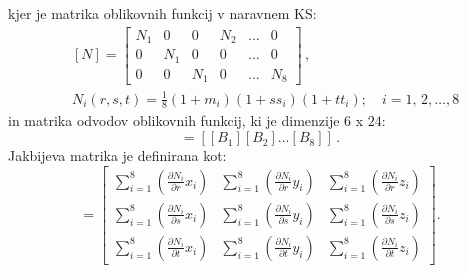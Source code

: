         kjer je matrika oblikovnih funkcij v naravnem KS: 
        \begin{align}
        &[N]=\left[\begin{array}{cccccc}
        N_{1} & 0 & 0 & N_{2} & \ldots & 0 \\
        0 & N_{1} & 0 & 0 & \ldots & 0 \\
        0 & 0 & N_{1} & 0 & \ldots & N_{8}
        \end{array}\right] \,, \\
        &N_{i}(r, s, t)=\frac{1}{8}\left(1+m_{i}\right)\left(1+s s_{i}\right)\left(1+t t_{i}\right) ; \quad i=1,\,2, \ldots, 8 
        \end{align}
        in matrika odvodov oblikovnih funkcij, ki je dimenzije $6$ x $24$:
        \begin{equation}
        [B]=\left[\left[B_{1}\right]\left[B_{2}\right] \ldots\left[B_{8}\right]\right] \,.
        \end{equation}
        Jakbijeva matrika je definirana kot:
        \begin{equation}
        [J]=
        \left[\begin{array}{ccc}
        \sum_{i=1}^{8}\left(\frac{\partial N_{i}}{\partial r} x_{i}\right) & \sum_{i=1}^{8}\left(\frac{\partial N_{i}}{\partial r} y_{i}\right) & \sum_{i=1}^{8}\left(\frac{\partial N_{i}}{\partial r} z_{i}\right) \\
        \sum_{i=1}^{8}\left(\frac{\partial N_{i}}{\partial s} x_{i}\right) & \sum_{i=1}^{8}\left(\frac{\partial N_{i}}{\partial s} y_{i}\right) & \sum_{i=1}^{8}\left(\frac{\partial N_{i}}{\partial s} z_{i}\right) \\
        \sum_{i=1}^{8}\left(\frac{\partial N_{i}}{\partial t} x_{i}\right) & \sum_{i=1}^{8}\left(\frac{\partial N_{i}}{\partial t} y_{i}\right) & \sum_{i=1}^{8}\left(\frac{\partial N_{i}}{\partial t} z_{i}\right)
        \end{array}\right].
        \end{equation}
        
        
       
       
       
        
